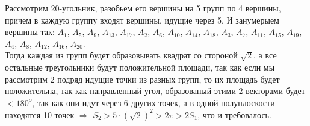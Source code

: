 		\begin{figure}[h]
		\end{figure}	
		\newpage
		Рассмотрим 20-угольник, разобьем его вершины на 5 групп по 4 вершины, причем в каждую группу входят вершины, идущие через 5. И занумерыем вершины так: 
		$A_{1}$, $A_{5}$, $A_{9}$, $A_{13}$, $A_{17}$, $A_{2}$, $A_{6}$, $A_{10}$, $A_{14}$, $A_{18}$, $A_{3}$, $A_{7}$, $A_{11}$, $A_{15}$, $A_{19}$, $A_{4}$, $A_{8}$, $A_{12}$, $A_{16}$, $A_{20}$.\\
		Тогда каждая из групп будет образовывать квадрат со стороной $\sqrt{2}$, а все остальные треугольники будут положительной площади, так как если мы рассмотрим 2 подряд идущие точки из разных групп, то их площадь будет положительна, так как направленный угол, образованый этими 2 векторами будет $< 180^o$, так как они идут через 6 других точек, а в одной полуплоскости находятся 10 точек $\Rightarrow$ $S_2 > 5 \cdot (\sqrt{2})^2 > 2 \pi > 2S_1$, что и требовалось.